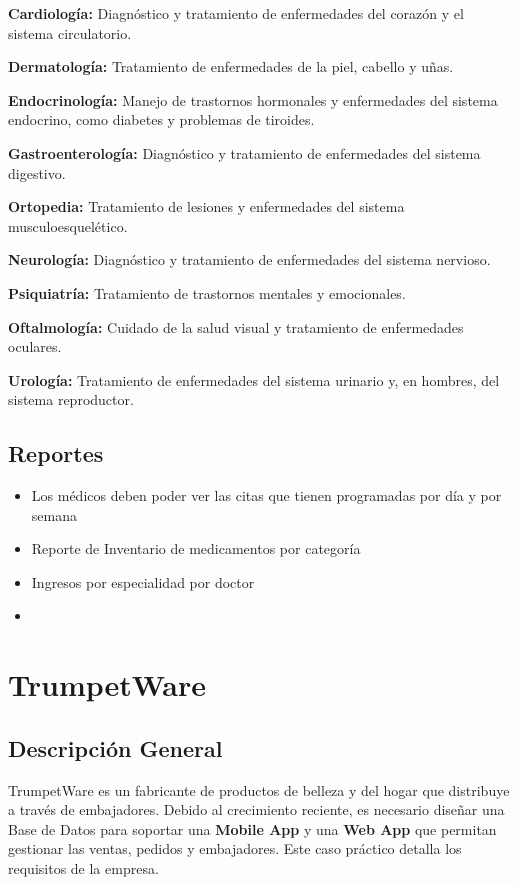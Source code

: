 \documentclass[
  letterpaper,
  DIV=11,
  numbers=noendperiod]{scrreprt}
\providecommand{\tightlist}{%
  \setlength{\itemsep}{0pt}\setlength{\parskip}{0pt}}\usepackage{longtable,booktabs,array}
\begin{document}
\textbf{Cardiología:} Diagnóstico y tratamiento de enfermedades del
corazón y el sistema circulatorio.

\textbf{Dermatología:} Tratamiento de enfermedades de la piel, cabello y
uñas.

\textbf{Endocrinología:} Manejo de trastornos hormonales y enfermedades
del sistema endocrino, como diabetes y problemas de tiroides.

\textbf{Gastroenterología:} Diagnóstico y tratamiento de enfermedades
del sistema digestivo.

\textbf{Ortopedia:} Tratamiento de lesiones y enfermedades del sistema
musculoesquelético.

\textbf{Neurología:} Diagnóstico y tratamiento de enfermedades del
sistema nervioso.

\textbf{Psiquiatría:} Tratamiento de trastornos mentales y emocionales.

\textbf{Oftalmología:} Cuidado de la salud visual y tratamiento de
enfermedades oculares.

\textbf{Urología:} Tratamiento de enfermedades del sistema urinario y,
en hombres, del sistema reproductor.

\section{Reportes}\label{reportes-2}

\begin{itemize}
\tightlist
\item
  Los médicos deben poder ver las citas que tienen programadas por día y
  por semana
\item
  Reporte de Inventario de medicamentos por categoría
\item
  Ingresos por especialidad por doctor
\item
\end{itemize}


\chapter{TrumpetWare}\label{trumpetware}

\section{Descripción General}\label{descripciuxf3n-general}

TrumpetWare es un fabricante de productos de belleza y del hogar que
distribuye a través de embajadores. Debido al crecimiento reciente, es
necesario diseñar una Base de Datos para soportar una \textbf{Mobile
App} y una \textbf{Web App} que permitan gestionar las ventas, pedidos y
embajadores. Este caso práctico detalla los requisitos de la empresa.
\end{document}
